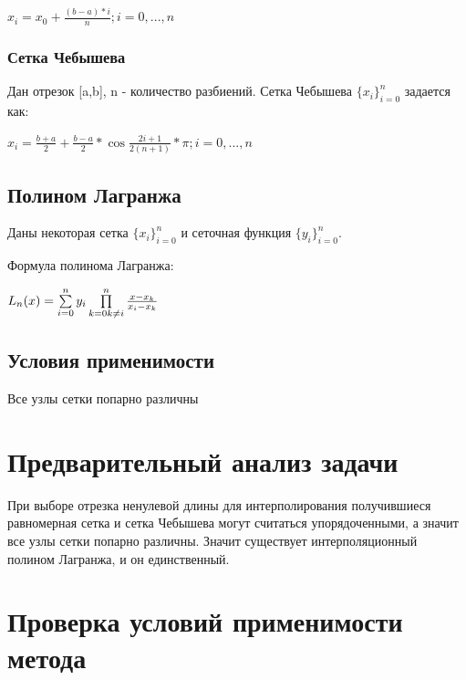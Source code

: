 \begin{math} 
	x_{i}=x_{0}+\frac{(b-a)*i}{n}; i=0,...,n
\end{math}

\subsubsection{Сетка Чебышева}

Дан отрезок [a,b], n - количество разбиений. Сетка Чебышева
\begin{math} 
	\{x_{i}\}_{i=0}^{n}
\end{math}
 задается как: 

\begin{math} 
	x_{i}=\frac{b+a}{2}+\frac{b-a}{2}*\cos{\frac{2i+1}{2(n+1)}*\pi}; i=0,...,n
\end{math}

\subsection{Полином Лагранжа}
Даны некоторая сетка 
\begin{math} 
   \{x_{i}\}_{i=0}^{n}
\end{math}
 и сеточная функция
 \begin{math} 
 	\{y_{i}\}_{i=0}^{n}
 \end{math}. 


Формула полинома Лагранжа: 

 \begin{math} 
	L_{n}(x)=\sum\limits_{i=0}^{n}y_{i}\prod\limits_{k=0 \\* k\neq i}^{n}\frac{x-x_{k}}{x_{i}-x_{k}}
\end{math} 

\subsection{Условия применимости}
Все узлы сетки попарно различны
\section{Предварительный анализ задачи}

При выборе отрезка ненулевой длины для интерполирования получившиеся равномерная сетка и сетка Чебышева могут считаться упорядоченными, а значит все узлы сетки попарно различны. Значит существует интерполяционный полином Лагранжа, и он единственный. 

\section{Проверка условий применимости метода}

